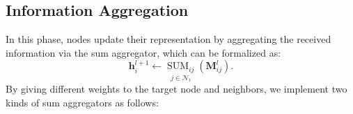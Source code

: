 \subsection{Information Aggregation} \label{sec:IA}
In this phase, nodes update their representation by aggregating the received information via the sum aggregator, which can be formalized as:
\begin{equation}
    \mathbf{h}_i^{l+1} \leftarrow \underset{j \in \mathcal{N}_i}{\operatorname{SUM}_{ij}}(\mathbf{M}_{ij}^l).
    \label{eq:sum}
\end{equation}
By giving different weights to the target node and neighbors, we implement two kinds of sum aggregators as follows:
